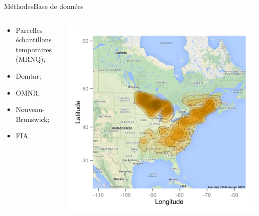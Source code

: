 \documentclass[10pt,aspectratio=149]{beamer}
\begin{document}
   \begin{frame}{Méthodes}{Base de données}
      \begin{columns}
         \begin{column}{0.5\textwidth}
             \begin{itemize}
               \item Parcelles échantillons temporaires (MRNQ);
               \item Domtar;
               \item OMNR;
               \item Nouveau-Brunswick;
               \item FIA.
            \end{itemize}
         \end{column}
         \begin{column}{0.5\textwidth}
            \begin{center}
               \includegraphics[height=0.6\textheight]{Figs/plots_map}
            \end{center}
         \end{column}
      \end{columns}        
   \end{frame}
\end{document}
